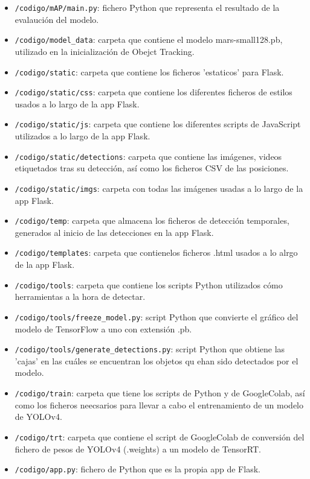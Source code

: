 \begin{itemize}
    \item \texttt{/codigo/mAP/main.py}: fichero Python que representa el resultado de la evalaución del modelo.
    \item \texttt{/codigo/model\_data}: carpeta que contiene el modelo mars-small128.pb, utilizado en la inicialización de Obejct Tracking.
    \item \texttt{/codigo/static}: carpeta que contiene los ficheros 'estaticos' para Flask.
    \item \texttt{/codigo/static/css}: carpeta que contiene los diferentes ficheros de estilos\cite{css} usados a lo largo de la app Flask.
    \item \texttt{/codigo/static/js}: carpeta que contiene los diferentes scripts de JavaScript\cite{js} utilizados a lo largo de la app Flask.
    \item \texttt{/codigo/static/detections}: carpeta que contiene las imágenes, videos etiquetados tras su detección, así como los ficheros CSV de las posiciones.
    \item \texttt{/codigo/static/imgs}: carpeta con todas las imágenes usadas a lo largo de la app Flask.
    \item \texttt{/codigo/temp}: carpeta que almacena los ficheros de detección temporales, generados al inicio de las detecciones en la app Flask.
    \item \texttt{/codigo/templates}: carpeta que contienelos ficheros .html usados a lo alrgo de la app Flask.
    \item \texttt{/codigo/tools}: carpeta que contiene los scripts Python utilizados cómo herramientas a la hora de detectar.
    \item \texttt{/codigo/tools/freeze\_model.py}: script Python que convierte el gráfico del modelo de TensorFlow a uno con extensión .pb.
    \item \texttt{/codigo/tools/generate\_detections.py}: script Python que obtiene las 'cajas' en las cuáles se encuentran los objetos qu ehan sido detectados por el modelo.
    \item \texttt{/codigo/train}: carpeta que tiene los scripts de Python y de GoogleColab, así como los ficheros neecsarios para llevar a cabo el entrenamiento de un modelo de YOLOv4.
    \item \texttt{/codigo/trt}: carpeta que contiene el script de GoogleColab de conversión del fichero de pesos de YOLOv4 (.weights) a un modelo de TensorRT.
    \item \texttt{/codigo/app.py}: fichero de Python que es la propia app de Flask.

\end{itemize}

